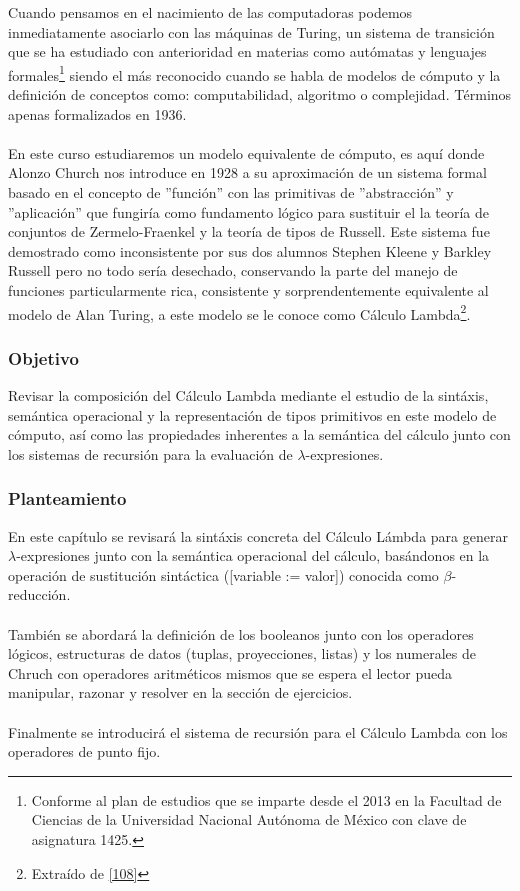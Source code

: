 Cuando pensamos en el nacimiento de las computadoras podemos inmediatamente asociarlo con las máquinas de Turing, un sistema de transición que se ha estudiado con anterioridad en materias como autómatas y lenguajes formales\footnote{Conforme al plan de estudios que se imparte desde el 2013 en la Facultad de Ciencias de la Universidad Nacional Autónoma de México con clave de asignatura 1425. } siendo el más reconocido cuando se habla de modelos de cómputo y la definición de conceptos como: computabilidad, algoritmo o complejidad. Términos apenas formalizados en 1936.\\\\
En este curso estudiaremos un modelo equivalente de cómputo, es aquí donde Alonzo Church nos introduce en 1928 a su aproximación de un sistema formal basado en el concepto de ''función'' con las primitivas de ''abstracción'' y ''aplicación'' que fungiría como fundamento lógico para sustituir el la teoría de conjuntos de Zermelo-Fraenkel y la teoría de tipos de Russell. Este sistema fue demostrado como inconsistente por sus dos alumnos Stephen Kleene y Barkley Russell pero no todo sería desechado, conservando la parte del manejo de funciones particularmente rica, consistente y sorprendentemente equivalente al modelo de Alan Turing, a este modelo se le conoce como Cálculo Lambda\footnote{Extraído de  \hyperlink{108}{[108]}}.\\


\subsubsection{Objetivo}
Revisar la composición del Cálculo Lambda mediante el estudio de la sintáxis, semántica operacional y la representación de tipos primitivos en este modelo de cómputo, así como las propiedades inherentes a la semántica del cálculo junto con los sistemas de recursión para la evaluación de $\lambda$-expresiones. \\ 

\subsubsection{Planteamiento}
En este capítulo se revisará la sintáxis concreta del Cálculo Lámbda para generar $\lambda$-expresiones junto con
la semántica operacional del cálculo, basándonos en la operación de sustitución sintáctica ([variable := valor]) conocida como $\beta$-reducción.\\\\
También se abordará la definición de los booleanos junto con los operadores lógicos, estructuras de datos (tuplas, proyecciones, listas) y los numerales de Chruch con operadores aritméticos mismos que se espera el lector pueda manipular, razonar y resolver en la sección de ejercicios. \\\\
Finalmente se introducirá el sistema de recursión para el Cálculo Lambda con los operadores de punto fijo.


